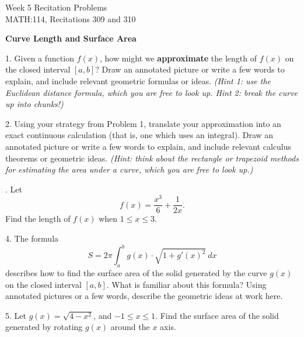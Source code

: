 \documentclass[11pt]{article}
\begin{document}
	{
		\centering
		\huge{Week 5 Recitation Problems} \\
		\Large{MATH:114, Recitations 309 and 310} \\
	}
	\vspace{3em}
	
	{
		\centering
		\large{\textbf{Curve Length and Surface Area}} \\
	}
	
	\vspace{3em}
	1. Given a function $f(x)$, how might we \textbf{approximate} the length of $f(x)$ on the closed interval $[a,b]$? Draw an annotated picture or write a few words to explain, and include relevant geometric formulas or ideas. \textit{(Hint 1: use the Euclidean distance formula, which you are free to look up. Hint 2: break the curve up into chunks!)}
	
	\vspace{0.3\textheight}
	2. Using your strategy from Problem 1, translate your approximation into an exact continuous calculation (that is, one which uses an integral). Draw an annotated picture or write a few words to explain, and include relevant calculus theorems or geometric ideas. \textit{(Hint: think about the rectangle or trapezoid methods for estimating the area under a curve, which you are free to look up.)}
	
	. Let $$f(x)=\frac{x^3}{6} + \frac{1}{2x}.$$ Find the length of $f(x)$ when $1 \leq x \leq 3$.
	
	\vspace{0.2\textheight}
	4. The formula $$ S = 2\pi \int_a^b g(x) \cdot \sqrt{1 + g'(x)^2} \ dx $$ describes how to find the surface area of the solid generated by the curve $g(x)$ on the closed interval $[a,b]$. What is familiar about this formula? Using annotated pictures or a few words, describe the geometric ideas at work here.
	
	\vspace{0.3\textheight}
	5. Let $g(x)=\sqrt{4-x^2}$, and $-1 \leq x \leq 1$. Find the surface area of the solid generated by rotating $g(x)$ around the $x$ axis.
	
\end{document}
